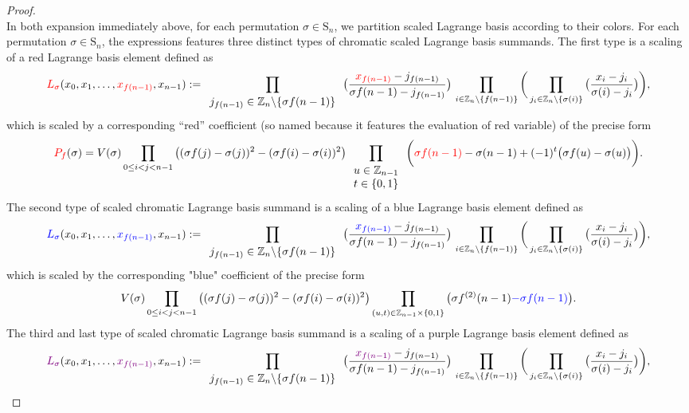 \begin{proof}
\[\]
In both expansion immediately above, for each permutation $\sigma\in\text{S}_{n}$, we partition scaled Lagrange basis according to their colors. For each permutation $\sigma\in\text{S}_{n}$, the expressions features three distinct types of chromatic scaled Lagrange basis summands. The first type is a scaling of a red Lagrange basis element defined as
\[
{\color{red}L_{\sigma}}(x_{0},x_{1},\ldots,{\color{red}x_{f(n-1)}},x_{n-1}):=\prod_{\begin{array}{c}
j_{f(n-1)}\in\mathbb{Z}_{n}\backslash\{\sigma f(n-1)\}\end{array}}\big(\frac{{\color{red}x_{f(n-1)}}-j_{f(n-1)}}{\sigma f(n-1)-j_{f(n-1)}}\big)\,\prod_{i\in\mathbb{Z}_{n}\backslash\{f(n-1)\}}\bigg(\prod_{j_{i}\in\mathbb{Z}_{n}\backslash\{\sigma(i)\}}\big(\frac{x_{i}-j_{i}}{\sigma(i)-j_{i}}\big)\bigg),
\]
which is scaled by a corresponding “red” coefficient (so named because it features the evaluation of red variable) of the precise form
\[
{\color{red}P_{f}}(\sigma)=V(\sigma)\prod_{0\le i<j<n-1}\big((\sigma f(j)-\sigma(j))^{2}-(\sigma f(i)-\sigma(i))^{2}\big)\prod_{\begin{array}{c}
u\in\mathbb{Z}_{n-1}\\
t\in\{0,1\}
\end{array}}\bigg({\color{red}\sigma f(n-1)}-\sigma(n-1)+(-1)^{t}\big(\sigma f(u)-\sigma(u)\big)\bigg).
\]
The second type of scaled chromatic Lagrange basis summand is a scaling of a blue Lagrange basis element defined as
\[
{\color{blue}L_{\sigma}}(x_{0},x_{1},\ldots,{\color{blue}x_{f(n-1)}},x_{n-1}):=\prod_{\begin{array}{c}
j_{f(n-1)}\in\mathbb{Z}_{n}\backslash\{\sigma f(n-1)\}\end{array}}\big(\frac{{\color{blue}x_{f(n-1)}}-j_{f(n-1)}}{\sigma f(n-1)-j_{f(n-1)}}\big)\,\prod_{i\in\mathbb{Z}_{n}\backslash\{f(n-1)\}}\bigg(\prod_{j_{i}\in\mathbb{Z}_{n}\backslash\{\sigma(i)\}}\big(\frac{x_{i}-j_{i}}{\sigma(i)-j_{i}}\big)\bigg),
\]
which is scaled by the corresponding "blue" coefficient of the precise form
\[
V(\sigma)\prod_{0\le i<j<n-1}\big((\sigma f(j)-\sigma(j))^{2}-(\sigma f(i)-\sigma(i))^{2}\big)\prod_{(u,t)\in\mathbb{Z}_{n-1}\times\{0,1\}}\big(\sigma f^{(2)}(n-1){\color{blue}-\sigma f(n-1)}\big).
\]
The third and last type of scaled chromatic Lagrange basis summand is a scaling of a purple Lagrange basis element defined as
\[
{\color{violet}L_{\sigma}}(x_{0},x_{1},\ldots,{\color{violet}x_{f(n-1)}},x_{n-1}):=\prod_{\begin{array}{c}
j_{f(n-1)}\in\mathbb{Z}_{n}\backslash\{\sigma f(n-1)\}\end{array}}\big(\frac{{\color{violet}x_{f(n-1)}}-j_{f(n-1)}}{\sigma f(n-1)-j_{f(n-1)}}\big)\,\prod_{i\in\mathbb{Z}_{n}\backslash\{f(n-1)\}}\bigg(\prod_{j_{i}\in\mathbb{Z}_{n}\backslash\{\sigma(i)\}}\big(\frac{x_{i}-j_{i}}{\sigma(i)-j_{i}}\big)\bigg),
\]
\end{proof}
